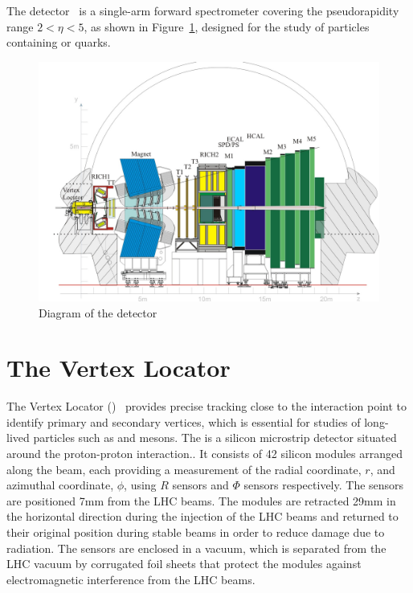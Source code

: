 The \lhcb detector~\cite{Alves:2008zz,LHCb-DP-2014-002} is a single-arm forward spectrometer covering the \mbox{pseudorapidity} range $2<\eta <5$, as shown in Figure~\ref{lhcbdetector}, designed for the study of particles containing \bquark or \cquark quarks.

\begin{figure}
\includegraphics[width=\linewidth]{figures/detector/lhcb.pdf}
\caption{Diagram of the \lhcb detector}
\label{lhcbdetector}
\end{figure}

\section{The Vertex Locator}

The Vertex Locator (\velo)~\cite{LHCb-DP-2014-001} provides precise tracking close to the interaction point to identify primary and secondary vertices, which is essential for studies of long-lived particles such as \B and \D mesons. The \velo is a silicon microstrip detector situated around the proton-proton interaction.. It consists of 42 silicon modules arranged along the beam, each providing a measurement of the radial coordinate, $r$, and azimuthal coordinate, $\phi$, using $R$ sensors and $\Phi$ sensors respectively. The sensors are positioned 7mm from the LHC beams. The \velo modules are retracted 29mm in the horizontal direction during the injection of the LHC beams and returned to their original position during stable beams in order to reduce damage due to radiation. The sensors are enclosed in a vacuum, which is separated from the LHC vacuum by corrugated foil sheets that protect the \velo modules against electromagnetic interference from the LHC beams.

